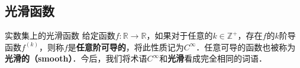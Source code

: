 
\subsection{光滑函数}

\begin{definition}{实数集上的光滑函数}
给定函数$f:\mathbb{R}\rightarrow\mathbb{R}$，如果对于任意的$k\in\mathbb{Z}^+$，存在$f$的$k$阶导函数$f^{(k)}$，则称$f$是\textbf{任意阶可导的}，将此性质记为$C^\infty$．任意可导的函数也被称为\textbf{光滑的（smooth）}．今后，我们将术语$C^{\infty}$和\textbf{光滑}看成完全相同的词语．
\end{definition}



